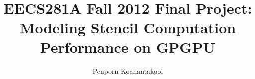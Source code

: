\documentclass{article}
\title{EECS281A Fall 2012 Final Project: \\ Modeling Stencil Computation Performance on GPGPU}
\author{Penporn Koanantakool}
\begin{document}
\maketitle







\pagebreak

\cite{inpar}



\end{document}
